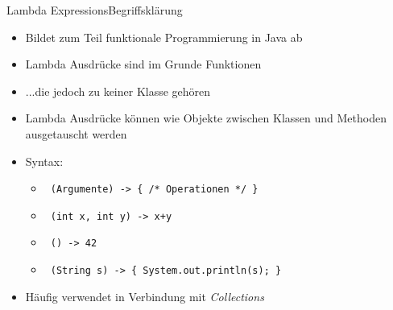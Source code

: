 \begin{frame}{Lambda Expressions}{Begriffsklärung}
    \begin{itemize}
        \item Bildet zum Teil funktionale Programmierung in Java ab
        \item Lambda Ausdrücke sind im Grunde Funktionen
        \item ...die jedoch zu keiner Klasse gehören
        \item Lambda Ausdrücke können wie Objekte zwischen Klassen und Methoden ausgetauscht werden
        \item Syntax:
        \begin{itemize}
            \item \texttt{ (Argumente) -> \{ /* Operationen */ \}}
            \item \texttt{ (int x, int y) -> x+y}
            \item \texttt{ () -> 42 }
            \item \texttt{ (String s) -> \{ System.out.println(s); \}}
        \end{itemize}
        \item Häufig verwendet in Verbindung mit \textit{Collections}
    \end{itemize}
\end{frame}